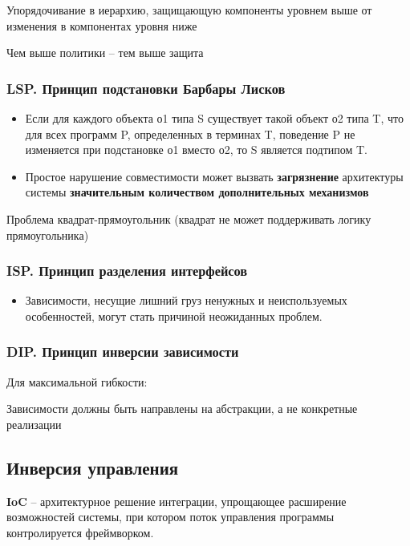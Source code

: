 Упорядочивание в иерархию, защищающую компоненты уровнем выше
от изменения в компонентах уровня ниже

Чем выше политики -- тем выше защита

\subsubsection{LSP. Принцип подстановки Барбары Лисков}

\begin{itemize}
    \item Если для каждого объекта о1 типа S существует такой
        объект о2 типа T, что для всех программ P, определенных
        в терминах T, поведение P не изменяется при подстановке о1
        вместо о2, то S является подтипом T.
    \item Простое нарушение совместимости может вызвать \textbf{
        загрязнение} архитектуры системы \textbf{значительным
    количеством дополнительных механизмов}
\end{itemize}

Проблема квадрат-прямоугольник (квадрат не может поддерживать логику
прямоугольника)

\subsubsection{ISP. Принцип разделения интерфейсов}

\begin{itemize}
    \item Зависимости, несущие лишний груз ненужных и неиспользуемых
        особенностей, могут стать причиной неожиданных проблем.
\end{itemize}

\subsubsection{DIP. Принцип инверсии зависимости}

Для максимальной гибкости:

Зависимости должны быть направлены на абстракции, а не конкретные
реализации

\subsection{Инверсия управления}

\textbf{IoC} -- архитектурное решение интеграции, упрощающее расширение
возможностей системы, при котором поток управления программы
контролируется фреймворком.

